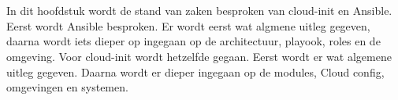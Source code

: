 \chapter{}
\label{ch:stand-van-zaken}






In dit hoofdstuk wordt de stand van zaken besproken van cloud-init en Ansible. Eerst wordt Ansible besproken. Er wordt eerst wat algmene uitleg gegeven, daarna wordt iets dieper op ingegaan op de architectuur, playook, roles en de omgeving. Voor cloud-init wordt hetzelfde gegaan. Eerst wordt er wat algemene uitleg gegeven. Daarna wordt er dieper ingegaan op de modules, Cloud config, omgevingen en systemen.

